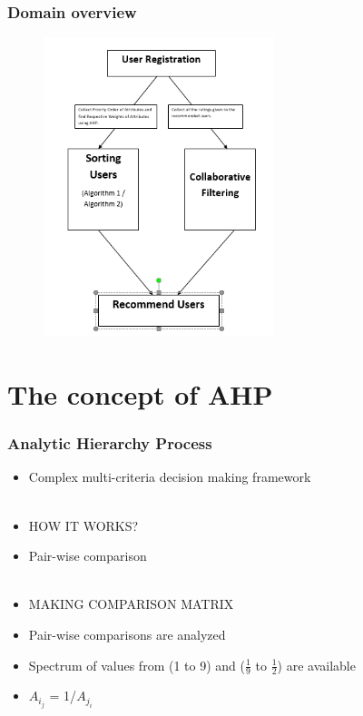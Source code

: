 \documentclass[10pt, compress]{beamer}
\begin{document}
\begin{frame}[fragile]
  \frametitle{Domain overview} 
 \begin{figure}[h!]
    \centering
    \includegraphics[width=0.6\textwidth]{images/flow.PNG}
    \label{fig:flow}
\end{figure}
\end{frame}



\section{The concept of AHP}

\begin{frame}[fragile]
  \frametitle{Analytic Hierarchy Process}
  \begin{itemize}
  \item<1> Complex multi-criteria decision making framework \\~\
  \item<1> \alert{HOW IT WORKS?}
 \item<1>Pair-wise comparison\\~\
 \item<1> \alert{MAKING COMPARISON MATRIX}
  \item<1> Pair-wise comparisons are analyzed
  \item<1> Spectrum of values from (1 to 9) and  (\(\displaystyle \frac{1}{9} \) to  \(\displaystyle \frac{1}{2} \)) are available
  \item<1> $A_i_j$ = 1/$A_j_i$
 \end{itemize}
\end{frame}
\end{document}
